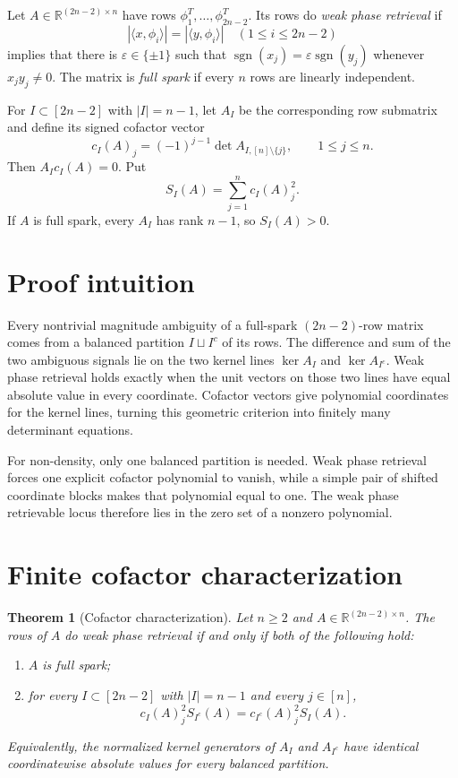 \documentclass[11pt]{article}
\newtheorem{theorem}{Theorem}
\newcommand{\R}{\mathbb{R}}
\newcommand{\ip}[2]{\langle #1,#2\rangle}
\begin{document}
Let $A\in\R^{(2n-2)\times n}$ have rows
$\phi_1^T,\ldots,\phi_{2n-2}^T$.  Its rows do \emph{weak phase retrieval}
if
\[
  |\ip{x}{\phi_i}|=|\ip{y}{\phi_i}|\quad(1\leq i\leq 2n-2)
\]
implies that there is $\varepsilon\in\{\pm1\}$ such that
$\operatorname{sgn}(x_j)=\varepsilon\operatorname{sgn}(y_j)$ whenever
$x_jy_j\ne0$.  The matrix is \emph{full spark} if every $n$ rows are
linearly independent.

For $I\subset[2n-2]$ with $|I|=n-1$, let $A_I$ be the corresponding row
submatrix and define its signed cofactor vector
\[
 c_I(A)_j=(-1)^{j-1}\det A_{I,[n]\setminus\{j\}},\qquad 1\leq j\leq n.
\]
Then $A_Ic_I(A)=0$.  Put
\[
 S_I(A)=\sum_{j=1}^n c_I(A)_j^2.
\]
If $A$ is full spark, every $A_I$ has rank $n-1$, so $S_I(A)>0$.

\section{Proof intuition}

Every nontrivial magnitude ambiguity of a full-spark $(2n-2)$-row matrix
comes from a balanced partition $I\sqcup I^c$ of its rows.  The difference
and sum of the two ambiguous signals lie on the two kernel lines
$\ker A_I$ and $\ker A_{I^c}$.  Weak phase retrieval holds exactly when the
unit vectors on those two lines have equal absolute value in every coordinate.
Cofactor vectors give polynomial coordinates for the kernel lines, turning
this geometric criterion into finitely many determinant equations.

For non-density, only one balanced partition is needed.  Weak phase retrieval
forces one explicit cofactor polynomial to vanish, while a simple pair of
shifted coordinate blocks makes that polynomial equal to one.  The weak phase
retrievable locus therefore lies in the zero set of a nonzero polynomial.

\section{Finite cofactor characterization}

\begin{theorem}[Cofactor characterization]\label{thm:characterization}
Let $n\geq2$ and $A\in\R^{(2n-2)\times n}$.  The rows of $A$ do weak phase
retrieval if and only if both of the following hold:
\begin{enumerate}[label=(\roman*)]
\item $A$ is full spark;
\item for every $I\subset[2n-2]$ with $|I|=n-1$ and every $j\in[n]$,
\begin{equation}\label{eq:cofactor}
 c_I(A)_j^2 S_{I^c}(A)=c_{I^c}(A)_j^2 S_I(A).
\end{equation}
\end{enumerate}
Equivalently, the normalized kernel generators of $A_I$ and $A_{I^c}$
have identical coordinatewise absolute values for every balanced partition.
\end{theorem}
\end{document}
